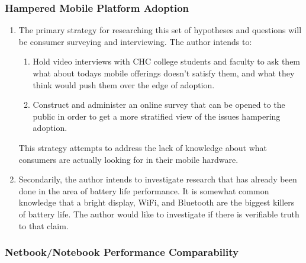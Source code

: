 \documentclass[12pt,oneside,letterpaper]{article}
\begin{document}
\subsubsection{Hampered Mobile Platform Adoption}

\begin{enumerate}

\item The primary strategy for researching this set of hypotheses and questions
  will be consumer surveying and interviewing.  The author intends to:

  \begin{enumerate}

  \item Hold video interviews with CHC college students and faculty to ask them
    what about todays mobile offerings doesn't satisfy them, and what they think
    would push them over the edge of adoption.

  \item Construct and administer an online survey that can be opened to the
    public in order to get a more stratified view of the issues hampering
    adoption.

  \end{enumerate}

  This strategy attempts to address the lack of knowledge about what consumers
  are actually looking for in their mobile hardware.

\item Secondarily, the author intends to investigate research that has already
  been done in the area of battery life performance.  It is somewhat common
  knowledge that a bright display, WiFi, and Bluetooth are the biggest killers
  of battery life.  The author would like to investigate if there is verifiable
  truth to that claim.

\end{enumerate}

\subsubsection{Netbook/Notebook Performance Comparability}
\end{document}

